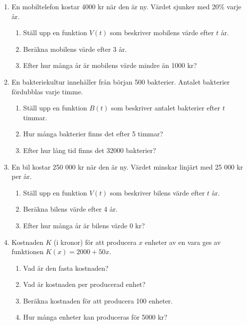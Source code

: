 \documentclass[a4paper,11pt]{article}
\begin{document}
\begin{enumerate}[label=\textbf{\arabic*.}]
    \item En mobiltelefon kostar 4000 kr när den är ny. Värdet sjunker med 20\% varje år.
    \begin{enumerate}[label=\alph*)]
        \item Ställ upp en funktion $V(t)$ som beskriver mobilens värde efter $t$ år.
        \item Beräkna mobilens värde efter 3 år.
        \item Efter hur många år är mobilens värde mindre än 1000 kr?
    \end{enumerate}
    
    \item En bakteriekultur innehåller från början 500 bakterier. Antalet bakterier fördubblas varje timme.
    \begin{enumerate}[label=\alph*)]
        \item Ställ upp en funktion $B(t)$ som beskriver antalet bakterier efter $t$ timmar.
        \item Hur många bakterier finns det efter 5 timmar?
        \item Efter hur lång tid finns det 32000 bakterier?
    \end{enumerate}
    
    \item En bil kostar 250 000 kr när den är ny. Värdet minskar linjärt med 25 000 kr per år.
    \begin{enumerate}[label=\alph*)]
        \item Ställ upp en funktion $V(t)$ som beskriver bilens värde efter $t$ år.
        \item Beräkna bilens värde efter 4 år.
        \item Efter hur många år är bilens värde 0 kr?
    \end{enumerate}
    
    \item Kostnaden $K$ (i kronor) för att producera $x$ enheter av en vara ges av funktionen $K(x) = 2000 + 50x$.
    \begin{enumerate}[label=\alph*)]
        \item Vad är den fasta kostnaden?
        \item Vad är kostnaden per producerad enhet?
        \item Beräkna kostnaden för att producera 100 enheter.
        \item Hur många enheter kan produceras för 5000 kr?
    \end{enumerate}
\end{enumerate}
\end{document}
